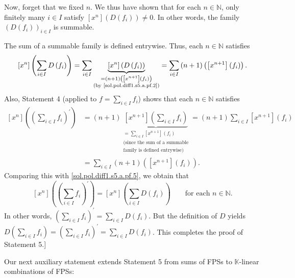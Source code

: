 \documentclass[paper=a4, fontsize=12pt]{scrartcl}%
\let\sumnonlimits\sum
\renewcommand{\sum}{\sumnonlimits\limits}
\theoremstyle{plainsl}
\theoremstyle{definition}
\theoremstyle{remark}
\begin{document}
Now, forget that we fixed $n$. We thus have shown that for each $n\in
\mathbb{N}$, only finitely many $i\in I$ satisfy $\left[  x^{n}\right]
\left(  D\left(  f_{i}\right)  \right)  \neq0$. In other words, the family
$\left(  D\left(  f_{i}\right)  \right)  _{i\in I}$ is summable.

The sum of a summable family is defined entrywise. Thus, each $n\in\mathbb{N}$
satisfies%
\begin{equation}
\left[  x^{n}\right]  \left(  \sum_{i\in I}D\left(  f_{i}\right)  \right)
=\sum_{i\in I}\underbrace{\left[  x^{n}\right]  \left(  D\left(  f_{i}\right)
\right)  }_{\substack{=\left(  n+1\right)  \left(  \left[  x^{n+1}\right]
\left(  f_{i}\right)  \right)  \\\text{(by \eqref{sol.pol.diff1.s5.a.pf.2})}%
}}=\sum_{i\in I}\left(  n+1\right)  \left(  \left[  x^{n+1}\right]  \left(
f_{i}\right)  \right)  . \label{sol.pol.diff1.s5.a.pf.5}%
\end{equation}
Also, Statement 4 (applied to $f=\sum_{i\in I}f_{i}$) shows that each
$n\in\mathbb{N}$ satisfies%
\begin{align*}
\left[  x^{n}\right]  \left(  \left(  \sum_{i\in I}f_{i}\right)  ^{\prime
}\right)   &  =\left(  n+1\right)  \underbrace{\left[  x^{n+1}\right]  \left(
\sum_{i\in I}f_{i}\right)  }_{\substack{=\sum_{i\in I}\left[  x^{n+1}\right]
\left(  f_{i}\right)  \\\text{(since the sum of a summable}\\\text{family is
defined entrywise)}}}=\left(  n+1\right)  \sum_{i\in I}\left[  x^{n+1}\right]
\left(  f_{i}\right) \\
&  =\sum_{i\in I}\left(  n+1\right)  \left(  \left[  x^{n+1}\right]  \left(
f_{i}\right)  \right)  .
\end{align*}
Comparing this with \eqref{sol.pol.diff1.s5.a.pf.5}, we obtain that%
\[
\left[  x^{n}\right]  \left(  \left(  \sum_{i\in I}f_{i}\right)  ^{\prime
}\right)  =\left[  x^{n}\right]  \left(  \sum_{i\in I}D\left(  f_{i}\right)
\right)  \qquad\text{for each }n\in\mathbb{N}\text{.}%
\]
In other words, $\left(  \sum_{i\in I}f_{i}\right)  ^{\prime}=\sum_{i\in
I}D\left(  f_{i}\right)  $. But the definition of $D$ yields $D\left(
\sum_{i\in I}f_{i}\right)  =\left(  \sum_{i\in I}f_{i}\right)  ^{\prime}%
=\sum_{i\in I}D\left(  f_{i}\right)  $. This completes the proof of Statement 5.]

\bigskip

Our next auxiliary statement extends Statement 5 from sums of FPSs to
$\mathbb{K}$-linear combinations of FPSs:
\end{document}
